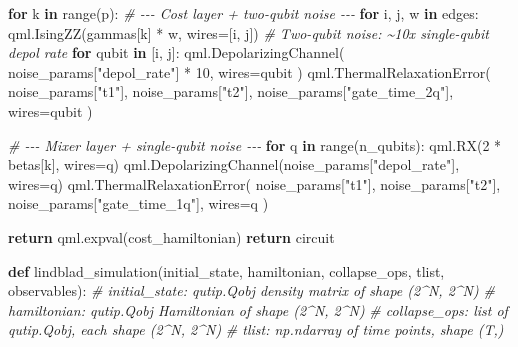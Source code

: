 \documentclass[
  11pt,
]{report}
\newenvironment{Shaded}{}{}
\newcommand{\BuiltInTok}[1]{\textcolor[rgb]{0.00,0.50,0.00}{#1}}
\newcommand{\CommentTok}[1]{\textcolor[rgb]{0.38,0.63,0.69}{\textit{#1}}}
\newcommand{\ControlFlowTok}[1]{\textcolor[rgb]{0.00,0.44,0.13}{\textbf{#1}}}
\newcommand{\DecValTok}[1]{\textcolor[rgb]{0.25,0.63,0.44}{#1}}
\newcommand{\KeywordTok}[1]{\textcolor[rgb]{0.00,0.44,0.13}{\textbf{#1}}}
\newcommand{\NormalTok}[1]{#1}
\newcommand{\OperatorTok}[1]{\textcolor[rgb]{0.40,0.40,0.40}{#1}}
\newcommand{\StringTok}[1]{\textcolor[rgb]{0.25,0.44,0.63}{#1}}
\begin{document}
\begin{Shaded}
\begin{Highlighting}[]
        \ControlFlowTok{for}\NormalTok{ k }\KeywordTok{in} \BuiltInTok{range}\NormalTok{(p):}
            \CommentTok{\# {-}{-}{-} Cost layer + two{-}qubit noise {-}{-}{-}}
            \ControlFlowTok{for}\NormalTok{ i, j, w }\KeywordTok{in}\NormalTok{ edges:}
\NormalTok{                qml.IsingZZ(gammas[k] }\OperatorTok{*}\NormalTok{ w, wires}\OperatorTok{=}\NormalTok{[i, j])}
                \CommentTok{\# Two{-}qubit noise: \textasciitilde{}10x single{-}qubit depol rate}
                \ControlFlowTok{for}\NormalTok{ qubit }\KeywordTok{in}\NormalTok{ [i, j]:}
\NormalTok{                    qml.DepolarizingChannel(}
\NormalTok{                        noise\_params[}\StringTok{"depol\_rate"}\NormalTok{] }\OperatorTok{*} \DecValTok{10}\NormalTok{, wires}\OperatorTok{=}\NormalTok{qubit}
\NormalTok{                    )}
\NormalTok{                    qml.ThermalRelaxationError(}
\NormalTok{                        noise\_params[}\StringTok{"t1"}\NormalTok{], noise\_params[}\StringTok{"t2"}\NormalTok{],}
\NormalTok{                        noise\_params[}\StringTok{"gate\_time\_2q"}\NormalTok{], wires}\OperatorTok{=}\NormalTok{qubit}
\NormalTok{                    )}

            \CommentTok{\# {-}{-}{-} Mixer layer + single{-}qubit noise {-}{-}{-}}
            \ControlFlowTok{for}\NormalTok{ q }\KeywordTok{in} \BuiltInTok{range}\NormalTok{(n\_qubits):}
\NormalTok{                qml.RX(}\DecValTok{2} \OperatorTok{*}\NormalTok{ betas[k], wires}\OperatorTok{=}\NormalTok{q)}
\NormalTok{                qml.DepolarizingChannel(noise\_params[}\StringTok{"depol\_rate"}\NormalTok{], wires}\OperatorTok{=}\NormalTok{q)}
\NormalTok{                qml.ThermalRelaxationError(}
\NormalTok{                    noise\_params[}\StringTok{"t1"}\NormalTok{], noise\_params[}\StringTok{"t2"}\NormalTok{],}
\NormalTok{                    noise\_params[}\StringTok{"gate\_time\_1q"}\NormalTok{], wires}\OperatorTok{=}\NormalTok{q}
\NormalTok{                )}

        \ControlFlowTok{return}\NormalTok{ qml.expval(cost\_hamiltonian)}
    \ControlFlowTok{return}\NormalTok{ circuit}


\KeywordTok{def}\NormalTok{ lindblad\_simulation(initial\_state, hamiltonian, collapse\_ops, tlist,}
\NormalTok{                        observables):}
    \CommentTok{\# initial\_state: qutip.Qobj density matrix of shape (2\^{}N, 2\^{}N)}
    \CommentTok{\# hamiltonian:   qutip.Qobj Hamiltonian of shape (2\^{}N, 2\^{}N)}
    \CommentTok{\# collapse\_ops:  list of qutip.Qobj, each shape (2\^{}N, 2\^{}N)}
    \CommentTok{\# tlist:         np.ndarray of time points, shape (T,)}


\end{Highlighting}
\end{Shaded}
\end{document}
